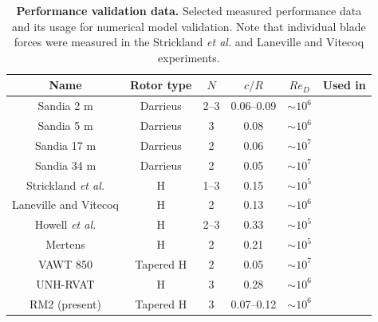 \documentclass[10pt,letterpaper]{article}
\begin{document}
\begin{table}
    \centering

    \begin{tabular}{c|c|c|c|c|c}
        Name & Rotor type & $N$ & $c/R$ & $Re_D$ & Used in \\
        \hline
        Sandia 2 m \cite{Blackwell1976} &  Darrieus  & 2--3 & 0.06--0.09 & $\sim 10^6$ & \cite{Roh2013,Bedon2014} \\
        Sandia 5 m \cite{Sheldahl1977} &  Darrieus  & 3 & 0.08 & $\sim 10^6$ & \cite{Antheaume2008,Bedon2014} \\
        Sandia 17 m \cite{Worstell1978} & Darrieus  & 2 & 0.06 & $\sim 10^7$ & \cite{Para1988,Orlandi2015,Bedon2014} \\
        Sandia 34 m \cite{Ashwill1992} & Darrieus  & 2 & 0.05 & $\sim 10^7$ & \cite{Liu1992,Murray2011,Bedon2014}  \\
        Strickland \emph{et al.} \cite{Strickland1981} & H & 1--3 & 0.15 & $\sim 10^5$ & \cite{Ponta2001,Scheurich2011b} \\
        Laneville and Vitecoq \cite{Laneville1986} & H & 2 & 0.13 & $\sim 10^6$ & \cite{Amet2009} \\
        Howell \emph{et al.} \cite{Howell2010} & H & 2--3 & 0.33 & $\sim 10^5$ & \cite{Joo2015} \\
        Mertens \cite{Mertens2003} & H & 2 & 0.21 & $\sim 10^5$ & \cite{Orlandi2015} \\
        VAWT 850 \cite{Mays1990} & Tapered H & 2 & 0.05 & $\sim 10^7$ & \cite{Murray2011} \\
        UNH-RVAT \cite{Bachant2014-RVAT-baseline} & H & 3 & 0.28 & $\sim 10^6$ & \cite{Michelen2014} \\
        RM2 (present) & Tapered H & 3 & 0.07--0.12 & $\sim 10^6$ &
    \end{tabular}

    \caption{\textbf{Performance validation data.} Selected measured performance
        data and its usage for numerical model validation. Note that individual
        blade forces were measured in the Strickland \emph{et al.} and Laneville and
        Vitecoq experiments.}

    \label{tab:validation-data}
\end{table}
\end{document}
